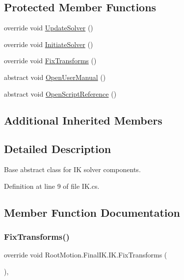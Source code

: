 \subsection*{Protected Member Functions}
\begin{DoxyCompactItemize}
\item 
override void \mbox{\hyperlink{class_root_motion_1_1_final_i_k_1_1_i_k_adec5648de6e1fc9fcbc2de325fc654a2}{Update\+Solver}} ()
\item 
override void \mbox{\hyperlink{class_root_motion_1_1_final_i_k_1_1_i_k_a5e26500361f7eb0c6515fa84b9c68e57}{Initiate\+Solver}} ()
\item 
override void \mbox{\hyperlink{class_root_motion_1_1_final_i_k_1_1_i_k_ac5d8c4a224b291865a31909a231acf07}{Fix\+Transforms}} ()
\item 
abstract void \mbox{\hyperlink{class_root_motion_1_1_final_i_k_1_1_i_k_a1922e31d550e27dcc60eca0d62c699c5}{Open\+User\+Manual}} ()
\item 
abstract void \mbox{\hyperlink{class_root_motion_1_1_final_i_k_1_1_i_k_a260f283903b1305b99485c9474c83927}{Open\+Script\+Reference}} ()
\end{DoxyCompactItemize}
\subsection*{Additional Inherited Members}


\subsection{Detailed Description}
Base abstract class for IK solver components. 



Definition at line 9 of file I\+K.\+cs.



\subsection{Member Function Documentation}
\mbox{\label{class_root_motion_1_1_final_i_k_1_1_i_k_ac5d8c4a224b291865a31909a231acf07}} 
\subsubsection{\texorpdfstring{Fix\+Transforms()}{FixTransforms()}}
{\footnotesize\ttfamily override void Root\+Motion.\+Final\+I\+K.\+I\+K.\+Fix\+Transforms (\begin{DoxyParamCaption}{ }\end{DoxyParamCaption})\hspace{0.3cm}{\ttfamily [protected]}, {\ttfamily [virtual]}}



